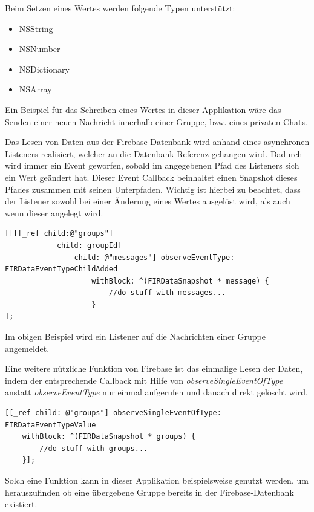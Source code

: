 Beim Setzen eines Wertes werden folgende Typen unterstützt:

\begin{itemize} 
\item NSString 
\item NSNumber
\item NSDictionary
\item NSArray
\end{itemize}

Ein Beispiel für das Schreiben eines Wertes in dieser Applikation wäre das Senden einer neuen Nachricht innerhalb einer Gruppe, bzw. eines privaten Chats.

Das Lesen von Daten aus der Firebase-Datenbank wird anhand eines asynchronen Listeners realisiert, welcher an die Datenbank-Referenz gehangen wird. Dadurch wird immer ein Event geworfen, sobald im angegebenen Pfad des Listeners sich ein Wert geändert hat. Dieser Event Callback beinhaltet einen Snapshot dieses Pfades zusammen mit seinen Unterpfaden. Wichtig ist hierbei zu beachtet, dass der Listener sowohl bei einer Änderung eines Wertes ausgelöst wird, als auch wenn dieser angelegt wird. 

\begin{lstlisting}
[[[[_ref child:@"groups"] 
			child: groupId] 
				child: @"messages"] observeEventType: FIRDataEventTypeChildAdded
                	withBlock: ^(FIRDataSnapshot * message) {
            	    	//do stuff with messages...
                	}
];
\end{lstlisting}

Im obigen Beispiel wird ein Listener auf die Nachrichten einer Gruppe angemeldet.

Eine weitere nützliche Funktion von Firebase ist das einmalige Lesen der Daten, indem der entsprechende Callback mit Hilfe von \textit{observeSingleEventOfType} anstatt \textit{observeEventType} nur einmal aufgerufen und danach direkt gelöscht wird.

\begin{lstlisting}
[[_ref child: @"groups"] observeSingleEventOfType: FIRDataEventTypeValue
	withBlock: ^(FIRDataSnapshot * groups) {
		//do stuff with groups...
	}];
\end{lstlisting}

Solch eine Funktion kann in dieser Applikation beispielsweise genutzt werden, um herauszufinden ob eine übergebene Gruppe bereits in der Firebase-Datenbank existiert.


